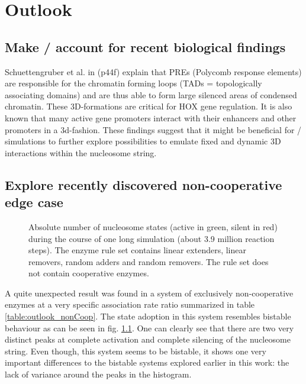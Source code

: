 \chapter{Outlook}
\label{cha:outlook}




\section{Make \ed/ account for recent biological findings}
    Schuettengruber et al. in \cite{schuettengruber2017genome} (p44f) %
    explain that PREs (Polycomb response elements) are responsible for the chromatin forming loops (TADs = topologically associating domains) and are thus able to form large silenced areas of condensed chromatin. These 3D-formations are critical for HOX gene regulation. It is also known that many active gene promoters interact with their enhancers and other promoters in a 3d-fashion. \cite{javierre2016lineage} These findings suggest that it might be beneficial for \ed/ simulations to further explore possibilities to emulate fixed and dynamic 3D interactions within the nucleosome string.
%
%
\section{Explore recently discovered non-cooperative edge case}
    \begin{figure}[htpb!]
        \centering
        \caption{Absolute number of nucleosome states (active in green, silent in red) during the course of one long simulation (about 3.9 million reaction steps). The enzyme rule set contains linear extenders, linear removers, random adders and random removers. The rule set does not contain cooperative enzymes.}
        \label{img:outlook_nonCoop}
    \end{figure}

    A quite unexpected result was found in a system of exclusively non-cooperative enzymes at a very specific association rate ratio summarized in table \ref{table:outlook_nonCoop}. The state adoption in this system resembles bistable behaviour as can be seen in fig. \ref{img:outlook_nonCoop}. One can clearly see that there are two very distinct peaks at complete activation and complete silencing of the nucleosome string. Even though, this system seems to be bistable, it shows one very important differences to the bistable systems explored earlier in this work: the lack of variance around the peaks in the histogram.

